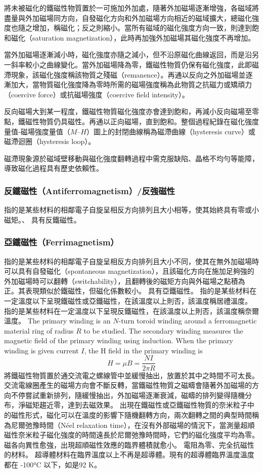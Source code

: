 \documentclass[a4paper,12pt]{report}
\begin{document}
\begin{itemize}
將未被磁化的鐵磁性物質置於一可施加外加處，隨著外加磁場逐漸增強，各磁域將盡量與外加磁場同方向，自發磁化方向和外加磁場方向相近的磁域擴大，總磁化強度也隨之增加，稱磁化；反之則縮小。當所有磁域的磁化強度方向一致，則達到飽和磁化（saturation magnetization），此時再加強外加磁場其磁化強度不再增加。

當外加磁場逐漸減小時，磁化強度亦隨之減小，但不沿原磁化曲線返回，而是沿另一斜率較小之曲線變化。當外加磁場降為零，鐵磁性物質仍保有磁化強度，此即磁滯現象，該磁化強度稱該物質之殘磁（remanence）。再通以反向之外加磁場並逐漸加大，當物質磁化強度降為零時所需的磁場強度稱為此物質之抗磁力或矯頑力（coercive force）或抗磁場強度（coercive field intensity）。

反向磁場大到某一程度，鐵磁性物質磁化強度亦會達到飽和，再減小反向磁場至零點，鐵磁性物質仍具磁性。再通以正向磁場，直到飽和。整個過程紀錄在磁化強度量值-磁場強度量值（$M–H$）圖上的封閉曲線稱為磁滯曲線（hysteresis curve）或磁滯迴圈（hysteresis loop）。

磁滯現象源於磁域壁移動與磁化強度翻轉過程中需克服缺陷、晶格不均勻等能障，導致磁化過程具有歷史依賴性。
\subsubsection{反鐵磁性（Antiferromagnetism）/反強磁性}
指的是某些材料的相鄰電子自旋呈相反方向排列且大小相等，使其始終具有零或小磁矩。、 具有反鐵磁性。
\subsubsection{亞鐵磁性（Ferrimagnetism）}
指的是某些材料的相鄰電子自旋呈相反方向排列且大小不同，使其在無外加磁場時可以具有自發磁化（spontaneous magnetization），且該磁化方向在施加足夠強的外加磁場時可以翻轉（switchability），且翻轉後的磁矩方向與外磁場之點積為正。其表現類似於鐵磁性，但磁化係數較小。 具有亞鐵磁性。
指的是某些材料在一定溫度以下呈現鐵磁性或亞鐵磁性，在該溫度以上則否，該溫度稱居禮溫度。
指的是某些材料在一定溫度以下呈現反鐵磁性，在該溫度以上則否，該溫度稱奈爾溫度。
The primary winding is an $N$-turn toroid winding around a ferromagnetic material ring of radius $R$ to be studied. The secondary winding measures the magnetic field of the primary winding using induction. When the primary winding is given current $I$, the H field in the primary winding is
\[H=\mu B=\frac{NI}{2\pi R}\]
將鐵磁性物質置於通交流電之螺線管中並緩慢抽出，放置於其中之時間不可太長。交流電線圈產生的磁場方向會不斷反轉，當鐵磁性物質之磁疇會隨著外加磁場的方向不停嘗試重新排列，隨緩慢抽出，外加磁場逐漸衰減，磁疇的排列變得隨機分布，淨磁矩趨近零，達到去磁效果。
出現在鐵磁性或亞鐵磁性物質的奈米粒子中的磁性形式，磁化可以在溫度的影響下隨機翻轉方向，兩次翻轉之間的典型時間稱為尼爾弛豫時間（Néel relaxation time），在沒有外部磁場的情況下，當測量超順磁性奈米粒子磁化強度的時間遠長於尼爾弛豫時間時，它們的磁化強度平均為零。磁各向異性愈強，出現超順磁性效應的臨界體積就愈小。
電阻為零、完全抗磁性的材料。
超導體材料在臨界溫度以上不再是超導體。現有的超導體臨界溫度溫度都在 -100°C 以下，如是92 K。

\end{itemize}
\end{document}
